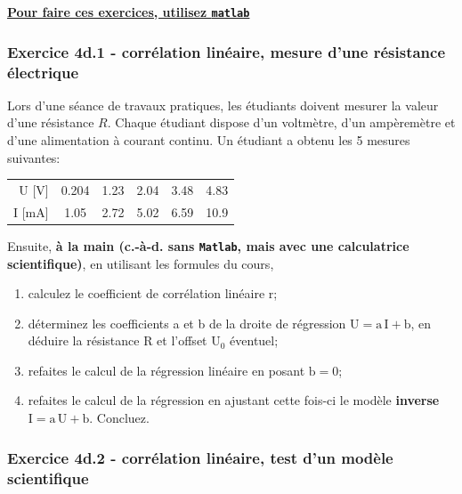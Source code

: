 \documentclass[main.tex]{subfiles}
\begin{document}
\begin{center}
    \Large \bf {\underline{Pour faire ces exercices, utilisez \texttt{matlab}}}
\end{center}

\subsubsection*{Exercice 4d.1 - corrélation linéaire, mesure d'une résistance électrique}

Lors d'une séance de travaux pratiques, les étudiants doivent mesurer la valeur d'une résistance $R$. Chaque étudiant dispose d'un voltmètre, d'un ampèremètre et d'une alimentation à courant continu. Un étudiant a obtenu les 5 mesures suivantes:
\begin{center}
    \begin{tabular}{r|ccccc}
        U [V]  & 0.204 & 1.23 & 2.04 & 3.48 & 4.83 \\
        I [mA] & 1.05  & 2.72 & 5.02 & 6.59 & 10.9
    \end{tabular}
\end{center}

Ensuite, \textbf{à la main (c.-à-d. sans \texttt{Matlab}, mais avec une calculatrice scientifique)}, en utilisant les formules du cours,
\begin{enumerate}
    \item calculez le coefficient de corrélation linéaire r;
    \item déterminez les coefficients a et b de la droite de régression $\text{U}=\text{a}\,\text{I}+\text{b}$, en déduire la résistance R et l'offset $\text{U}_0$ éventuel;
    \item refaites le calcul de la régression linéaire en posant $\text{b}=0$;
    \item refaites le calcul de la régression en ajustant cette fois-ci le modèle \textbf{inverse} $\text{I}=\text{a}\,\text{U}+\text{b}$. Concluez.
\end{enumerate}

\subsubsection*{Exercice 4d.2 - corrélation linéaire, test d'un modèle scientifique}
\end{document}
